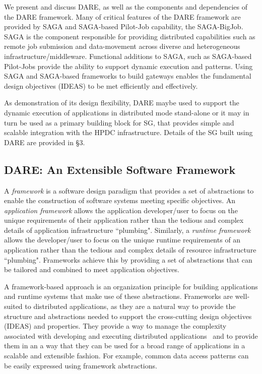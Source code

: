 \documentclass[]{svjour3}
\begin{document}
We present and discuss DARE, as well as the components and
dependencies of the DARE framework.  Many of critical features of the
DARE framework are provided by SAGA and SAGA-based Pilot-Job
capability, the SAGA-BigJob\cite{saga_bigjob_condor_cloud}.  SAGA is
the component responsible for providing distributed capabilities such
as remote job submission and data-movement across diverse and
heterogeneous infrastructure/middleware.  Functional additions to
SAGA, such as SAGA-based Pilot-Jobs provide the ability to support
dynamic execution and patterns.  Using SAGA and SAGA-based frameworks
to build gateways enables the fundamental design objectives (IDEAS) to
be met efficiently and effectively.

As demonstration of its design flexibility, DARE maybe used to support
the dynamic execution of applications in distributed mode stand-alone
or it may in turn be used as a primary building block for SG, that
provides simple and scalable integration with the HPDC infrastructure.
Details of the SG built using DARE are provided in \S3.



\subsection{DARE: An Extensible Software Framework}


A {\em framework} is a software design paradigm that provides a set of
abstractions to enable the construction of software systems meeting
specific objectives. An {\em application framework} allows the
application developer/user to focus on the unique requirements of
their application rather than the tedious and complex details of
application infrastructure ``plumbing". Similarly, a {\em runtime
  framework} allows the developer/user to focus on the unique runtime
requirements of an application rather than the tedious and complex
details of resource infrastructure ``plumbing". Frameworks achieve
this by providing a set of abstractions that can be tailored and
combined to meet application objectives.

A framework-based approach is an organization principle for building
applications and runtime systems that make use of these abstractions.
Frameworks are well-suited to distributed applications, as they are a
natural way to provide the structure and abstractions needed to
support the cross-cutting design objectives (IDEAS) and properties.
They provide a way to manage the complexity associated with developing
and executing distributed applications~\cite{dpa-surveypaper} and to
provide them in an a way that they can be used for a broad range of
applications in a scalable and extensible fashion. For example, common
data access patterns can be easily expressed using framework
abstractions.  %
\end{document}
